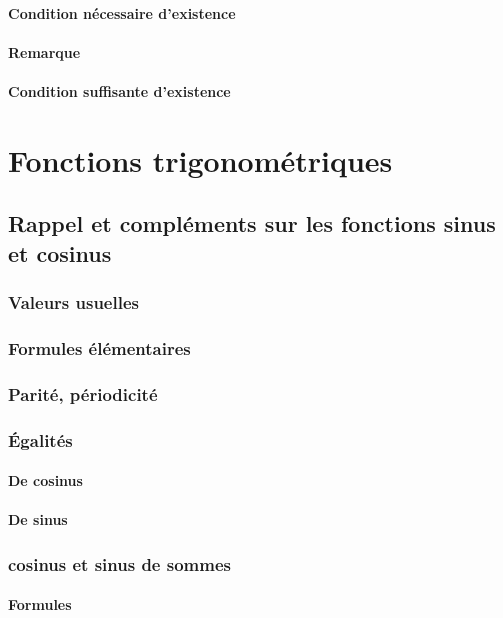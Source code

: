 \documentclass[12pt,a4paper,french]{book}
\begin{document}
			\subsubsection{Condition nécessaire d'existence}
			\subsubsection{Remarque}
			\subsubsection{Condition suffisante d'existence}
			
\chapter{Fonctions trigonométriques}
	\section{Rappel et compléments sur les fonctions sinus et cosinus}
		\subsection{Valeurs usuelles}
		\subsection{Formules élémentaires}
		\subsection{Parité, périodicité}
		\subsection{Égalités}
			\subsubsection{De cosinus}
			\subsubsection{De sinus}
		\subsection{cosinus et sinus de sommes}
			\subsubsection{Formules}
\end{document}
